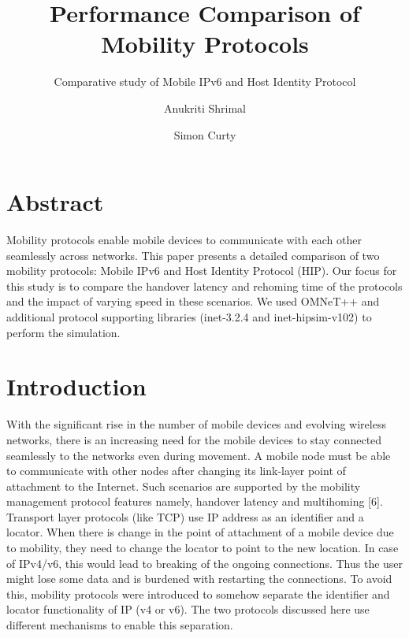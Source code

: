 \documentclass{llncs}
\begin{document}
\title{Performance Comparison of Mobility Protocols}


\subtitle{Comparative study of Mobile IPv6 and Host Identity Protocol}


\author{Anukriti Shrimal \and Simon Curty} 







\section{Abstract} 
Mobility protocols enable mobile devices to communicate with each other seamlessly across networks. This paper presents a detailed comparison of two mobility protocols: Mobile IPv6 and Host Identity Protocol (HIP). Our focus for this study is to compare the handover latency and rehoming time of the protocols and the impact of varying speed in these scenarios. We used OMNeT++ and additional protocol supporting libraries (inet-3.2.4 and inet-hipsim-v102) to perform the simulation.

\section{Introduction}
With the significant rise in the number of mobile devices and evolving wireless networks, there is an increasing need for the mobile devices to stay connected seamlessly to the networks even during movement. A mobile node must be able to communicate with other nodes after changing its link-layer point of attachment to the Internet. Such scenarios are supported by the mobility management protocol features namely, handover latency and multihoming [6].
Transport layer protocols (like TCP) use IP address as an identifier and a locator. When there is change in the point of attachment of a mobile device due to mobility, they need to change the locator to point to the new location. In case of IPv4/v6, this would lead to breaking of the ongoing connections. Thus the user might lose some data and is burdened with restarting the connections. To avoid this, mobility protocols were introduced to somehow separate the identifier and locator functionality of IP (v4 or v6). The two protocols discussed here use different mechanisms to enable this separation.
\end{document}
